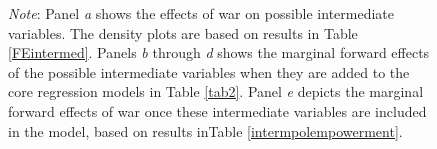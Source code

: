 \documentclass [12pt] {article}
\renewcommand{\footnotesize}{\scriptsize} %
\begin{document}
\begin{figure}[h]
  \begin{flushleft}  
        {\footnotesize {\it Note}: Panel \emph{a} shows the effects of war on possible intermediate variables. The density plots are based on results in Table \ref{FEintermed}. Panels \emph{b} through \emph{d} shows the marginal forward effects of the possible intermediate variables when they are added to the core regression models in Table \ref{tab2}. Panel \emph{e} depicts the marginal forward effects of war once these intermediate variables are included in the model, based on results inTable \ref{intermpolempowerment}.}
       \end{flushleft} 
\end{figure}

\newpage
\appendix
\tableofcontents
{}
\setcounter{page}{1}

\end{document}

